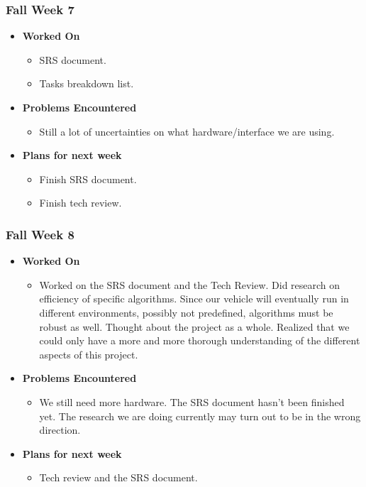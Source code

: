\documentclass{article}
\begin{document}
\subsubsection{Fall Week 7}
\begin{itemize}
    \item {\textbf{Worked On}}
    \begin{itemize}
      \item SRS document.
      \item Tasks breakdown list.
    \end{itemize}

    \item {\textbf{Problems Encountered}}
    \begin{itemize}
      \item Still a lot of uncertainties on what hardware/interface we are using.
    \end{itemize}

    \item{\textbf{Plans for next week}}
    \begin{itemize}
      \item Finish SRS document.
      \item Finish tech review.
    \end{itemize}

\end{itemize}

\subsubsection{Fall Week 8}
\begin{itemize}
    \item {\textbf{Worked On}}
    \begin{itemize}
      \item Worked on the SRS document and the Tech Review. Did research on
      efficiency of specific algorithms. Since our vehicle will eventually
      run in different environments, possibly not predefined, algorithms
      must be robust as well. Thought about the project as a whole. Realized
      that we could only have a more and more thorough understanding of the
      different aspects of this project.
    \end{itemize}

    \item {\textbf{Problems Encountered}}
    \begin{itemize}
      \item We still need more hardware. The SRS document hasn't been
      finished yet. The research we are doing currently may turn out to be
      in the wrong direction.
    \end{itemize}

    \item{\textbf{Plans for next week}}
    \begin{itemize}
      \item Tech review and the SRS document.
    \end{itemize}

\end{itemize}
\end{document}
